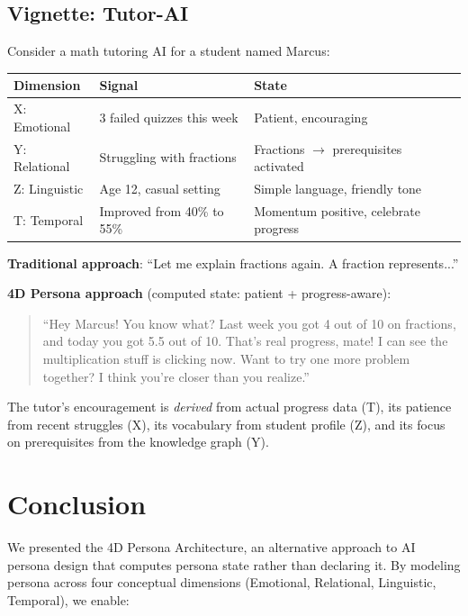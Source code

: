 \documentclass[11pt]{article}
\begin{document}
\subsection{Vignette: Tutor-AI}

Consider a math tutoring AI for a student named Marcus:

\begin{table}[h]
\centering
\begin{tabular}{lll}
\toprule
\textbf{Dimension} & \textbf{Signal} & \textbf{State} \\
\midrule
X: Emotional & 3 failed quizzes this week & Patient, encouraging \\
Y: Relational & Struggling with fractions & Fractions $\rightarrow$ prerequisites activated \\
Z: Linguistic & Age 12, casual setting & Simple language, friendly tone \\
T: Temporal & Improved from 40\% to 55\% & Momentum positive, celebrate progress \\
\bottomrule
\end{tabular}
\end{table}

\textbf{Traditional approach}: ``Let me explain fractions again. A fraction represents...''

\textbf{4D Persona approach} (computed state: patient + progress-aware):

\begin{quote}
``Hey Marcus! You know what? Last week you got 4 out of 10 on fractions, and today you got 5.5 out of 10. That's real progress, mate! I can see the multiplication stuff is clicking now. Want to try one more problem together? I think you're closer than you realize.''
\end{quote}

The tutor's encouragement is \textit{derived} from actual progress data (T), its patience from recent struggles (X), its vocabulary from student profile (Z), and its focus on prerequisites from the knowledge graph (Y).

\section{Conclusion}

We presented the 4D Persona Architecture, an alternative approach to AI persona design that computes persona state rather than declaring it. By modeling persona across four conceptual dimensions (Emotional, Relational, Linguistic, Temporal), we enable:
\end{document}

